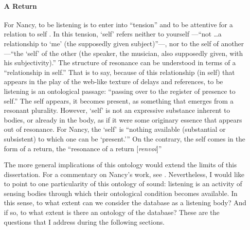 \paragraph{A Return}
For Nancy, to be listening is to enter into ``tension'' and to be attentive for a relation to self \parencite[12][All subsequent quotes from this passage.]{Nan07:Lis}. In this tension, `self' refers neither to yourself ---``not \dots a relationship to `me' (the supposedly given subject)''---, nor to the self of another ---``the `self' of the other (the speaker, the musician, also supposedly given, with his subjectivity).'' The structure of resonance can be understood in terms of a ``relationship in self.'' That is to say, because of this relationship (in self) that appears in the play of the web-like texture of delays and references, to be listening is an ontological passage: ``passing over to the register of presence to self.'' The self appears, it becomes present, as something that emerges from a resonant plurality. However, `self' is not an expressive substance inherent to bodies, or already in the body, as if it were some originary essence that appears out of resonance. For Nancy, the `self' is ``nothing available (substantial or subsistent) to which one can be `present.''' On the contrary, the self comes in the form of a return, the ``resonance of a return [\textit{renvoi}]''  

The more general implications of this ontology would extend the limits of this dissertation. For a commentary on Nancy's work, see \textcite{Gra15:The}. Nevertheless, I would like to point to one particularity of this ontology of sound: listening is an activity of sensing bodies through which their ontological condition becomes available. In this sense, to what extent can we consider the database as a listening body? And if so, to what extent is there an ontology of the database? These are the questions that I address during the following sections.

